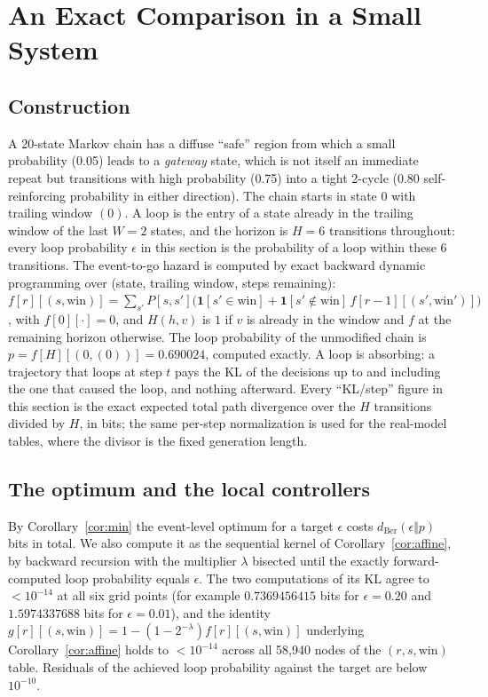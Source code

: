 \documentclass[11pt]{article}
\begin{document}
\section{An Exact Comparison in a Small System}
\label{sec:synthetic}

\subsection{Construction}
A 20-state Markov chain has a diffuse ``safe'' region from which a small probability (0.05) leads to a \emph{gateway} state, which is not itself an immediate repeat but transitions with high probability (0.75) into a tight 2-cycle (0.80 self-reinforcing probability in either direction). The chain starts in state 0 with trailing window $(0)$. A loop is the entry of a state already in the trailing window of the last $W{=}2$ states, and the horizon is $H{=}6$ transitions throughout: every loop probability $\epsilon$ in this section is the probability of a loop within these 6 transitions. The event-to-go hazard is computed by exact backward dynamic programming over (state, trailing window, steps remaining): $f[r][(s,\text{win})]=\sum_{s'}P[s,s']\big(\mathbf{1}[s'\in\text{win}]+\mathbf{1}[s'\notin\text{win}]\,f[r{-}1][(s',\text{win}')]\big)$, with $f[0][\cdot]{=}0$, and $H(h,v)$ is $1$ if $v$ is already in the window and $f$ at the remaining horizon otherwise. The loop probability of the unmodified chain is $p=f[H][(0,(0))]=0.690024$, computed exactly. A loop is absorbing: a trajectory that loops at step $t$ pays the KL of the decisions up to and including the one that caused the loop, and nothing afterward. Every ``KL/step'' figure in this section is the exact expected total path divergence over the $H$ transitions divided by $H$, in bits; the same per-step normalization is used for the real-model tables, where the divisor is the fixed generation length.

\subsection{The optimum and the local controllers}
\label{ssec:oracle}
By Corollary~\ref{cor:min} the event-level optimum for a target $\epsilon$ costs $d_{\mathrm{Ber}}(\epsilon\Vert p)$ bits in total. We also compute it as the sequential kernel of Corollary~\ref{cor:affine}, by backward recursion with the multiplier $\lambda$ bisected until the exactly forward-computed loop probability equals $\epsilon$. The two computations of its KL agree to $<10^{-14}$ at all six grid points (for example $0.7369456415$ bits for $\epsilon{=}0.20$ and $1.5974337688$ bits for $\epsilon{=}0.01$), and the identity $g[r][(s,\text{win})]=1-(1-2^{-\lambda})f[r][(s,\text{win})]$ underlying Corollary~\ref{cor:affine} holds to $<10^{-14}$ across all 58{,}940 nodes of the $(r,s,\text{win})$ table. Residuals of the achieved loop probability against the target are below $10^{-10}$.
\end{document}
